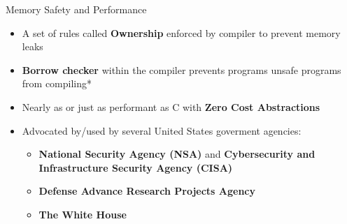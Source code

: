 \documentclass[8pt,compress,aspectratio=169]{beamer}
\newcommand\LightBold[1]{\textcolor{VSBlueLight}{\textbf{#1}}}
\newcommand\DarkBold[1]{\textcolor{VSBlueDark}{\textbf{#1}}}
\begin{document}
\begin{frame}
\begin{minipage}{0.20\textwidth}
  \end{minipage}
  \hfill
  \vspace{-8px}
  \begin{block}{Memory Safety and Performance}
    \begin{itemize}
      \item A set of rules called \DarkBold{Ownership} enforced by compiler to prevent memory leaks
      \item \DarkBold{Borrow checker} within the compiler prevents programs unsafe programs from compiling*
      \item Nearly as or just as performant as C with \DarkBold{Zero Cost Abstractions}
      \item Advocated by/used by several United States goverment agencies:
        \begin{itemize}
          \item \LightBold{National Security Agency (NSA)} and 
            \LightBold{Cybersecurity and Infrastructure Security Agency (CISA)}
          \item \LightBold{Defense Advance Research Projects Agency} 
          \item \LightBold{The White House}
        \end{itemize}
    \end{itemize}
  \end{block}
\end{frame}

\end{document}
